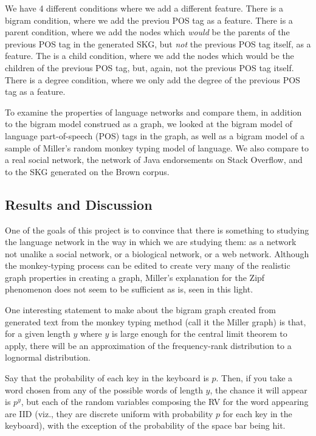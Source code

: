 \documentclass[12pt]{article}
\begin{document}
We have 4 different conditions where we add a different feature. There is a bigram condition, where we add the previou POS tag as a feature. There is a parent condition, where we add the nodes which \emph{would} be the parents of the previous POS tag in the generated SKG, but \emph{not} the previous POS tag itself, as a feature. The is a child condition, where we add the nodes which would be the children of the previous POS tag, but, again, not the previous POS tag itself. There is a degree condition, where we only add the degree of the previous POS tag as a feature. %


To examine the properties of language networks and compare them, in addition to the bigram model construed as a graph, we looked at the bigram model of language part-of-speech (POS) tags in the graph, as well as a bigram model of a sample of Miller's random monkey typing model of language. We also compare to a real social network, the network of Java endorsements on Stack Overflow, and to the SKG generated on the Brown corpus.%

\subsection*{Results and Discussion}

One of the goals of this project is to convince that there is something to studying the language network in the way in which we are studying them: as a network not unalike a social network, or a biological network, or a web network. Although the monkey-typing process can be edited to create very many of the realistic graph properties in creating a graph, Miller's explanation for the Zipf phenomenon does not seem to be sufficient as is, seen in this light.

One interesting statement to make about the bigram graph created from generated text from the monkey typing method (call it the Miller graph) is that, for a given length $y$ where $y$ is large enough for the central limit theorem to apply, there will be an approximation of the frequency-rank distribution to a lognormal distribution.

Say that the probability of each key in the keyboard is $p$. Then, if you take a word chosen from any of the possible words of length $y$, the chance it will appear is $p^y$, but each of the random variables composing the RV for the word appearing are IID (viz., they are discrete uniform with probability $p$ for each key in the keyboard), with the exception of the probability of the space bar being hit.
\end{document}
